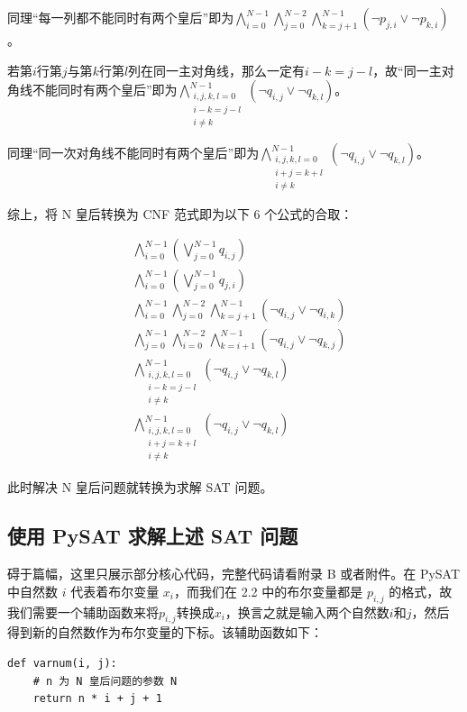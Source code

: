 \documentclass{article}
\begin{document}
同理“每一列都不能同时有两个皇后”即为$\bigwedge_{i=0}^{N-1} \bigwedge_{j=0}^{N-2}\bigwedge_{k=j+1}^{N-1}(\neg p_{j,i} \vee \neg p_{k, i})$。

若第$i$行第$j$与第$k$行第$l$列在同一主对角线，那么一定有$i-k=j-l$，故“同一主对角线不能同时有两个皇后”即为$\bigwedge_{\substack{i,j,k,l=0 \\ i-k=j-l \\ i \neq k}}^{N-1} (\neg q_{i,j} \vee \neg q_{k,l})$。

同理“同一次对角线不能同时有两个皇后”即为$\bigwedge_{\substack{i,j,k,l=0 \\ i+j=k+l \\ i \neq k}}^{N-1} (\neg q_{i,j} \vee \neg q_{k,l})$。

综上，将 N 皇后转换为 CNF 范式即为以下 6 个公式的合取：

\begin{align}
&\bigwedge_{i=0}^{N-1} \left( \bigvee_{j=0}^{N-1} q_{i,j} \right) \\
&\bigwedge_{i=0}^{N-1} \left( \bigvee_{j=0}^{N-1} q_{j,i} \right) \\
&\bigwedge_{i=0}^{N-1} \bigwedge_{j=0}^{N-2} \bigwedge_{k=j+1}^{N-1} (\neg q_{i,j} \vee \neg q_{i,k}) \\
&\bigwedge_{j=0}^{N-1} \bigwedge_{i=0}^{N-2} \bigwedge_{k=i+1}^{N-1} (\neg q_{i,j} \vee \neg q_{k,j}) \\
&\bigwedge_{\substack{i,j,k,l=0 \\ i-k=j-l \\ i \neq k}}^{N-1} (\neg q_{i,j} \vee \neg q_{k,l}) \\
&\bigwedge_{\substack{i,j,k,l=0 \\ i+j=k+l \\ i \neq k}}^{N-1} (\neg q_{i,j} \vee \neg q_{k,l})
\end{align}

此时解决 N 皇后问题就转换为求解 SAT 问题。

\subsection{使用 PySAT 求解上述 SAT 问题}

碍于篇幅，这里只展示部分核心代码，完整代码请看附录 B 或者附件。在 PySAT 中自然数 $i$ 代表着布尔变量 $x_i$，而我们在 2.2 中的布尔变量都是 $p_{i,j}$ 的格式，故我们需要一个辅助函数来将$p_{i,j}$转换成$x_i$，换言之就是输入两个自然数$i$和$j$，然后得到新的自然数作为布尔变量的下标。该辅助函数如下：

\begin{lstlisting}
def varnum(i, j):
    # n 为 N 皇后问题的参数 N
    return n * i + j + 1
\end{lstlisting}
\end{document}

